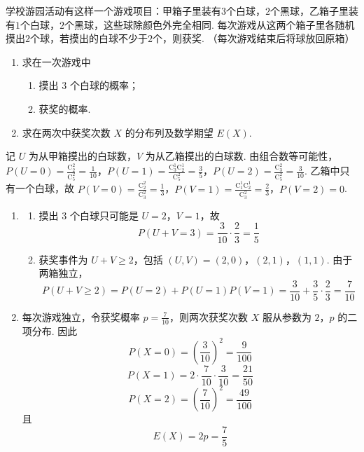 \begin{problem}
学校游园活动有这样一个游戏项目：甲箱子里装有\(3\)个白球，\(2\)个黑球，乙箱子里装有\(1\)个白球，\(2\)个黑球，这些球除颜色外完全相同. 每次游戏从这两个箱子里各随机摸出\(2\)个球，若摸出的白球不少于\(2\)个，则获奖. （每次游戏结束后将球放回原箱）
\begin{enumerate}
\item 求在一次游戏中
\begin{enumerate}
    \item 摸出 \(3\) 个白球的概率；
    \item 获奖的概率.
\end{enumerate}
\item 求在两次中获奖次数 \(X\) 的分布列及数学期望 \(E(X)\).
\end{enumerate}
\begin{solution}
记 \(U\) 为从甲箱摸出的白球数，\(V\) 为从乙箱摸出的白球数. 由组合数等可能性，
\(P(U=0)=\frac{\mathrm C_2^2}{\mathrm C_5^2}=\frac1{10}\)，\(P(U=1)=\frac{\mathrm C_3^1\mathrm C_2^1}{\mathrm C_5^2}=\frac35\)，\(P(U=2)=\frac{\mathrm C_3^2}{\mathrm C_5^2}=\frac3{10}\).
乙箱中只有一个白球，故
\(P(V=0)=\frac{\mathrm C_2^2}{\mathrm C_3^2}=\frac13\)，\(P(V=1)=\frac{\mathrm C_1^1\mathrm C_2^1}{\mathrm C_3^2}=\frac23\)，\(P(V=2)=0\).

\begin{enumerate}
\item
\begin{enumerate}
\item 摸出 \(3\) 个白球只可能是 \(U=2\)，\(V=1\)，故
\[
P(U+V=3)=\frac3{10}\cdot\frac23=\frac15
\]
\item 获奖事件为 \(U+V\geqslant2\)，包括
\((U,V)=(2,0)\)，\((2,1)\)，\((1,1)\). 由于两箱独立，
\[
P(U+V\geqslant2)
=P(U=2)+P(U=1)P(V=1)
=\frac3{10}+\frac35\cdot\frac23
=\frac7{10}
\]
\end{enumerate}

\item 每次游戏独立，令获奖概率 \(p=\frac{7}{10}\)，则两次获奖次数 \(X\) 服从参数为 \(2\)，\(p\) 的二项分布. 因此
\[
P(X=0)=\left(\frac3{10}\right)^2=\frac9{100}
\]
\[
P(X=1)=2\cdot\frac7{10}\cdot\frac3{10}=\frac{21}{50}
\]
\[
P(X=2)=\left(\frac7{10}\right)^2=\frac{49}{100}
\]
且
\[
E(X)=2p=\frac75
\]
\end{enumerate}
\end{solution}
\end{problem}

